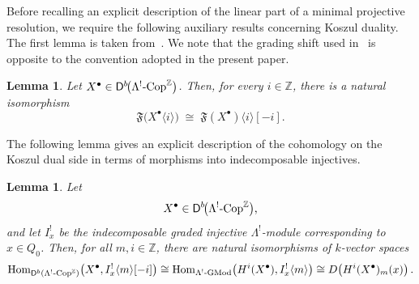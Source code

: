 \documentclass[11pt]{article}
\newtheorem{lemma}[theorem]{Lemma}
\theoremstyle{definition}
\theoremstyle{remark}
\begin{document}
Before recalling an explicit description of the linear part of a minimal projective resolution, we require the following auxiliary results concerning Koszul duality. The first lemma is taken from~\cite[Lemma~4.2]{4}. We note that the grading shift used in~\cite{4} is opposite to the convention adopted in the present paper.

\begin{lemma}
Let \(X^{\bullet} \in \mathsf{D}^{b}\!\bigl(\Lambda^{!}\textup{-Cop}^{\mathbb{Z}}\bigr)\). Then, for every \(i \in \mathbb{Z}\), there is a natural isomorphism
\[
\mathfrak{F}\bigl(X^{\bullet}\langle i\rangle\bigr)
\;\cong\;
\mathfrak{F}(X^{\bullet})\langle i\rangle [-i].
\]
\end{lemma}

\medskip

The following lemma gives an explicit description of the cohomology on the Koszul dual side in terms of morphisms into indecomposable injectives.

\begin{lemma}
Let
\[
X^{\bullet}\in
\mathsf{D}^{b}\!\bigl(
\Lambda^{!}\textup{-}\mathrm{Cop}^{\mathbb{Z}}
\bigr),
\]
and let \(I_x^{!}\) be the indecomposable graded injective
\(\Lambda^{!}\)-module corresponding to \(x\in Q_0\). Then, for all
\(m,i\in\mathbb Z\), there are natural isomorphisms of \(k\)-vector spaces
\[
\operatorname{Hom}_{\mathsf{D}^{b}
(\Lambda^{!}\textup{-}\mathrm{Cop}^{\mathbb{Z}})}
\bigl(
X^{\bullet},
I_x^{!}\langle m\rangle[-i]
\bigr)
\cong
\operatorname{Hom}_{\Lambda^{!}\textup{-}\mathrm{GMod}}
\bigl(
H^{i}(X^{\bullet}),
I_x^{!}\langle m\rangle
\bigr)
\cong
D\!\left(H^{i}(X^{\bullet})_{m}(x)\right).
\]
\end{lemma}
\end{document}
